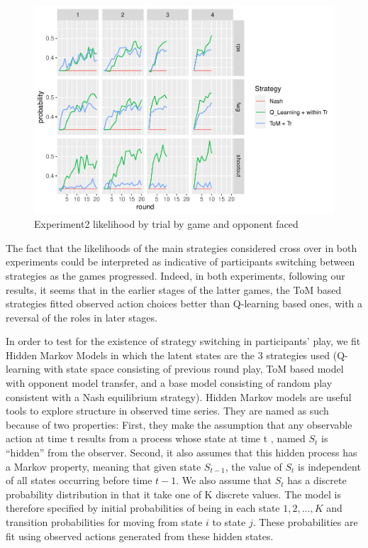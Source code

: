 \documentclass[man,floatsintext]{apa6}
\begin{document}
\begin{figure}

{\centering \includegraphics{draft_upgrade_v1_files/figure-latex/exp2-lik-by-tr-1} 

}

\caption{Experiment2 likelihood by trial by game and opponent faced}\label{fig:exp2-lik-by-tr}
\end{figure}

The fact that the likelihoods of the main strategies considered cross over in both experiments could be interpreted as indicative of participants switching between strategies as the games progressed. Indeed, in both experiments, following our results, it seems that in the earlier stages of the latter games, the ToM based strategies fitted observed action choices better than Q-learning based ones, with a reversal of the roles in later stages.

In order to test for the existence of strategy switching in participants' play, we fit Hidden Markov Models in which the latent states are the 3 strategies used (Q-learning with state space consisting of previous round play, ToM based model with opponent model transfer, and a base model consisting of random play consistent with a Nash equilibrium strategy). Hidden Markov models are useful tools to explore structure in observed time series. They are named as such because of two properties: First, they make the assumption that any observable action at time t results from a process whose state at time t , named \(S_{t}\) is \enquote{hidden} from the observer. Second, it also assumes that this hidden process has a Markov property, meaning that given state \(S_{t-1}\), the value of \(S_{t}\) is independent of all states occurring before time \(t-1\). We also assume that \(S_{t}\) has a discrete probability distribution in that it take one of K discrete values. The model is therefore specified by initial probabilities of being in each state \({1,2,...,K}\) and transition probabilities for moving from state \(i\) to state \(j\). These probabilities are fit using observed actions generated from these hidden states.
\end{document}
